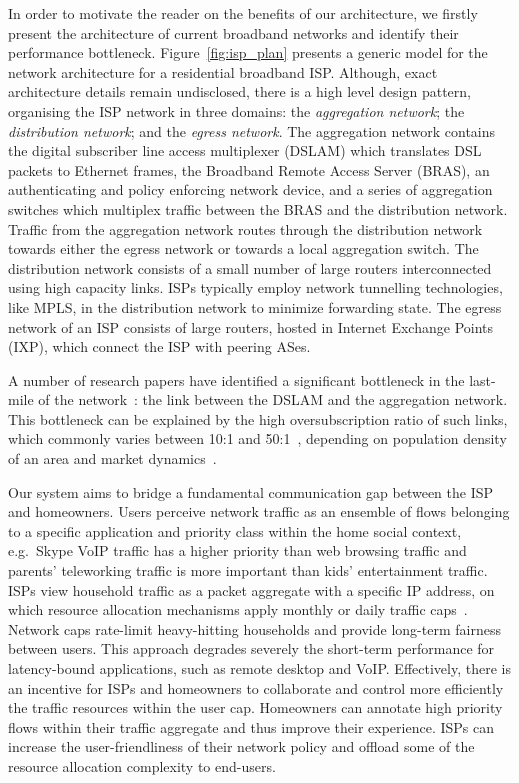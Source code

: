In order to motivate the reader on the benefits of our architecture, we firstly
present the architecture of current broadband networks and identify their
performance bottleneck. Figure~\ref{fig:isp_plan} presents a generic model for
the network architecture for a residential broadband ISP\@. Although, exact
architecture details remain undisclosed, there is a high level design pattern,
organising the ISP network in three domains: the \textit{aggregation network};
the \textit{distribution network}; and the \textit{egress network}. The
aggregation network contains the digital subscriber line access multiplexer
(DSLAM) which translates DSL packets to Ethernet frames, the Broadband Remote
Access Server (BRAS), an authenticating and policy enforcing network device,
and a series of aggregation switches which multiplex traffic between the BRAS and
the distribution network.  Traffic from the aggregation network routes through
the distribution network towards either the egress network or towards a local
aggregation switch. The distribution network consists of a small number of
large routers interconnected using high capacity links.  ISPs typically employ
network tunnelling technologies, like MPLS, in the distribution network to
minimize forwarding state.  The egress network of an ISP consists of large
routers, hosted in Internet Exchange Points (IXP), which connect the ISP with
peering ASes.

A number of research papers have identified a significant bottleneck in the
last-mile of the network~: the link between
the DSLAM and the aggregation network. This bottleneck can be explained by the
high oversubscription ratio of such links, which commonly varies between 10:1
and 50:1~, depending on population density of an area
and market dynamics~.  

Our system aims to bridge a fundamental communication gap between the ISP and
homeowners. Users perceive network traffic as an ensemble of flows belonging to
a specific application and priority class within the home social context,
e.g.~Skype VoIP traffic has a higher priority than web browsing traffic and
parents' teleworking traffic is more important than kids' entertainment traffic.
ISPs view household traffic as a packet aggregate with a specific IP address, on
which resource allocation mechanisms apply monthly or daily traffic
caps~.  Network caps rate-limit heavy-hitting
households and provide long-term fairness between users. This approach degrades
severely the short-term performance for latency-bound applications, such as
remote desktop and VoIP\@. Effectively, there is an incentive for ISPs and
homeowners to collaborate and control more efficiently the traffic resources
within the user cap.  Homeowners can annotate high priority flows within their
traffic aggregate and thus improve their experience. ISPs can increase
the user-friendliness of their network policy and offload some of the resource
allocation complexity to end-users. 

